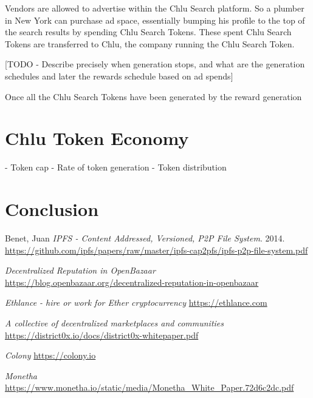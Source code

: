 \documentclass[a4paper]{article}
\begin{document}
Vendors are allowed to advertise within the Chlu Search platform. So a
plumber in New York can purchase ad space, essentially bumping his
profile to the top of the search results by spending Chlu Search
Tokens. These spent Chlu Search Tokens are transferred to Chlu, the
company running the Chlu Search Token.

[TODO - Describe precisely when generation stops, and what are the
  generation schedules and later the rewards schedule based on ad spends]

Once all the Chlu Search Tokens have been generated by the reward generation

\section{Chlu Token Economy}

- Token cap
- Rate of token generation
- Token distribution


\section{Conclusion}


\medskip
 
\begin{thebibliography}{9}

  Benet, Juan
  \textit{IPFS - Content Addressed, Versioned, P2P File System}. 2014.
  \url{https://github.com/ipfs/papers/raw/master/ipfs-cap2pfs/ipfs-p2p-file-system.pdf}

  \textit{Decentralized Reputation in OpenBazaar}
  \newline
  \url{https://blog.openbazaar.org/decentralized-reputation-in-openbazaar}

  \textit{Ethlance - hire or work for Ether cryptocurrency}
  \url{https://ethlance.com}

  \textit{A collective of decentralized marketplaces and communities}
  \url{https://district0x.io/docs/district0x-whitepaper.pdf}

  \textit{Colony}
  \url{https://colony.io}

  \textit{Monetha}
  \url{https://www.monetha.io/static/media/Monetha_White_Paper.72d6c2dc.pdf}
  
\end{thebibliography}
\end{document}
